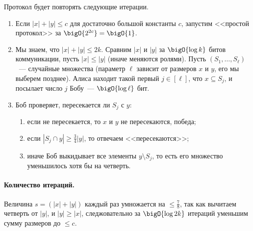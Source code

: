 Протокол будет повторять следующие итерации.
\begin{enumerate}
    \item Если $|x| + |y| \le c$ для достаточно большой константы $c$, запустим <<простой протокол>> за
        $\bigO{2^{2c}} = \bigO{1}$.
    \item Мы знаем, что $|x| + |y| \le 2k$. Сравним $|x|$ и $|y|$ за $\bigO{\log k}$ битов коммуникации,
        пусть $|x| \le |y|$ (иначе меняются ролями). Пусть $(S_1, \dots, S_{\ell})$~--- случайные
        множества (параметр $\ell$ зависит от размеров $x$ и $y$, его мы выберем позднее).
        Алиса находит такой первый $j \in [\ell]$, что $x \subseteq S_j$, и посылает число $j$ Бобу~---
        $\bigO{\log \ell}$ бит.
    \item Боб проверяет, пересекается ли $S_j$ с $y$:
        \begin{enumerate}
            \item если не пересекается, то $x$ и $y$ не пересекаются, победа;
            \item если $|S_j \cap y| \ge \frac{3}{4}|y|$, то отвечаем <<пересекаются>>;
            \item иначе Боб выкидывает все элементы $y \setminus S_j$, то есть его множество уменьшилось
                хотя бы на четверть.
        \end{enumerate}
\end{enumerate}


\paragraph{Количество итераций.} Величина $s = (|x| + |y|)$ каждый раз умножается на $\le \frac{7}{8}$,
так как вычитаем четверть от $|y|$, и $|y| \ge |x|$, следжовательно за $\bigO{\log 2k}$ итераций уменьшим
сумму размеров до $\le c$.

